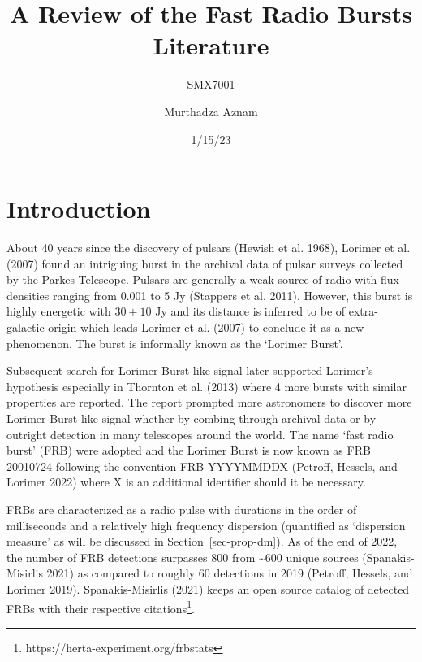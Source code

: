 \documentclass[
  letterpaper,
  DIV=11,
  numbers=noendperiod]{scrreport}
\title{A Review of the Fast Radio Bursts Literature}
\subtitle{SMX7001}
\author{Murthadza Aznam}
\date{1/15/23}
\renewcommand*\contentsname{Table of contents}
\newcommand\contentsname{Table of contents}
\begin{document}
\maketitle
\ifdefined\Shaded\renewenvironment{Shaded}{\begin{tcolorbox}[frame hidden, interior hidden, borderline west={3pt}{0pt}{shadecolor}, enhanced, breakable, sharp corners, boxrule=0pt]}{\end{tcolorbox}}\fi

\renewcommand*\contentsname{Table of contents}
{
\hypersetup{linkcolor=}
\setcounter{tocdepth}{2}
\tableofcontents
}

\hypertarget{introduction}{%
\chapter{Introduction}\label{introduction}}

About 40 years since the discovery of pulsars (Hewish et al. 1968),
Lorimer et al. (2007) found an intriguing burst in the archival data of
pulsar surveys collected by the Parkes Telescope. Pulsars are generally
a weak source of radio with flux densities ranging from 0.001 to 5 Jy
(Stappers et al. 2011). However, this burst is highly energetic with
\(30\pm 10\) Jy and its distance is inferred to be of extra-galactic
origin which leads Lorimer et al. (2007) to conclude it as a new
phenomenon. The burst is informally known as the `Lorimer Burst'.

Subsequent search for Lorimer Burst-like signal later supported
Lorimer's hypothesis especially in Thornton et al. (2013) where 4 more
bursts with similar properties are reported. The report prompted more
astronomers to discover more Lorimer Burst-like signal whether by
combing through archival data or by outright detection in many
telescopes around the world. The name `fast radio burst' (FRB) were
adopted and the Lorimer Burst is now known as FRB 20010724 following the
convention FRB YYYYMMDDX (Petroff, Hessels, and Lorimer 2022) where X is
an additional identifier should it be necessary.

FRBs are characterized as a radio pulse with durations in the order of
milliseconds and a relatively high frequency dispersion (quantified as
`dispersion measure' as will be discussed in Section~\ref{sec-prop-dm}).
As of the end of 2022, the number of FRB detections surpasses 800 from
\textasciitilde600 unique sources (Spanakis-Misirlis 2021) as compared
to roughly 60 detections in 2019 (Petroff, Hessels, and Lorimer 2019).
Spanakis-Misirlis (2021) keeps an open source catalog of detected FRBs
with their respective citations\footnote{https://herta-experiment.org/frbstats}.
\end{document}
